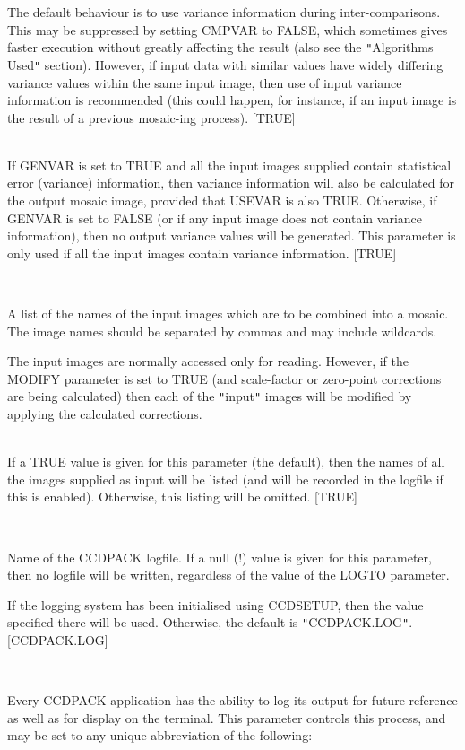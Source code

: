 \documentclass[twoside,11pt]{article}
\newcommand{\htmlref}[2]{#1}
\renewcommand{\_}{\texttt{\symbol{95}}}
\newcommand{\qt}[1]{{\tt "}#1{\tt "}}
\newcommand{\xroutine}[1]{\htmlref{{\sc #1}}{#1}}
\newcommand{\sstsubsection}[1]{ \item[{#1}] \mbox{} \\}
\newcommand{\sstitemlist}[1]{
  \mbox{} \\
  \vspace{-3.5ex}
  \begin{itemize}
     #1
  \end{itemize}
}
\newcommand{\sstsubsection}[1]{\item[{#1}]}
\newcommand{\sstitemlist}[1]{
      \begin{itemize}
         #1
      \end{itemize}
      \\
   }
\begin{document}
{{{         The default behaviour is to use variance information during
         inter-comparisons. This may be suppressed by setting CMPVAR to
         FALSE, which sometimes gives faster execution without greatly
         affecting the result (also see the \qt{Algorithms Used} section).
         However, if input data with similar values have widely
         differing variance values within the same input image, then use
         of input variance information is recommended (this could
         happen, for instance, if an input image is the result of a
         previous mosaic-ing process).
         [TRUE]
      }
      \sstsubsection{
         GENVAR = \_LOGICAL (Read)
      } {
         If GENVAR is set to TRUE and all the input images supplied
         contain statistical error (variance) information, then
         variance information will also be calculated for the output
         mosaic image, provided that USEVAR is also TRUE. Otherwise,
         if GENVAR is set to FALSE (or if any input image does not
         contain variance information), then no output variance values
         will be generated.  This parameter is only used if all the
         input images contain variance information.
         [TRUE]
      }
      \sstsubsection{
         IN = LITERAL (Read and [optionally] Write)
      } {
         A list of the names of the input images which are to be combined
         into a mosaic. The image names should be separated by commas
         and may include wildcards.

         The input images are normally accessed only for reading.
         However, if the MODIFY parameter is set to TRUE (and
         scale-factor or zero-point corrections are being calculated)
         then each of the \qt{input} images will be modified by applying the
         calculated corrections.
      }
      \sstsubsection{
         LISTIN = \_LOGICAL (Read)
      } {
         If a TRUE value is given for this parameter (the default),
         then the names of all the images supplied as input will be
         listed (and will be recorded in the logfile if this is
         enabled).  Otherwise, this listing will be omitted.
         [TRUE]
      }
      \sstsubsection{
         LOGFILE = FILENAME (Read)
      } {
         Name of the CCDPACK logfile.  If a null (!) value is given for
         this parameter, then no logfile will be written, regardless of
         the value of the LOGTO parameter.

         If the logging system has been initialised using \xroutine{CCDSETUP},
         then the value specified there will be used. Otherwise, the
         default is \qt{CCDPACK.LOG}.
         [CCDPACK.LOG]
      }
      \sstsubsection{
         LOGTO = LITERAL (Read)
      } {
         Every CCDPACK application has the ability to log its output
         for future reference as well as for display on the terminal.
         This parameter controls this process, and may be set to any
         unique abbreviation of the following:
         \sstitemlist{

}}}}
\end{document}
